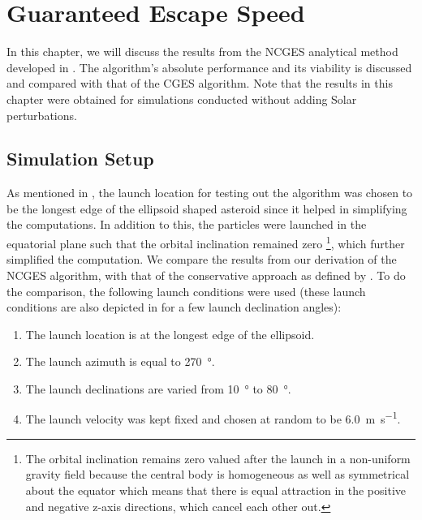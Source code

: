 \chapter{Guaranteed Escape Speed}
\label{chap:nonconservative}
\graphicspath{{Results/Images/}}

In this chapter, we will discuss the results from the \gls{NCGES} analytical method developed in . The algorithm's absolute performance and its viability is discussed and compared with that of the \gls{CGES} algorithm. Note that the results in this chapter were obtained for simulations conducted without adding Solar perturbations.

\section{Simulation Setup}
\label{sec:nonconservative_simulation_setup}
As mentioned in , the launch location for testing out the algorithm was chosen to be the longest edge of the ellipsoid shaped asteroid since it helped in simplifying the computations. In addition to this, the particles were launched in the equatorial plane such that the orbital inclination remained zero \footnote{The orbital inclination remains zero valued after the launch in a non-uniform gravity field because the central body is homogeneous as well as symmetrical about the equator which means that there is equal attraction in the positive and negative z-axis directions, which cancel each other out.}, which further simplified the computation.
%
\newline\newline
%
We compare the results from our derivation of the \gls{NCGES} algorithm, with that of the conservative approach as defined by \cite{scheeresBook}. To do the comparison, the following launch conditions were used (these launch conditions are also depicted in  for a few launch declination angles):
\begin{enumerate}
    \item The launch location is at the longest edge of the ellipsoid.
    \item The launch azimuth is equal to \SI{270}{\degree}.
    \item The launch declinations are varied from \SI{10}{\degree} to \SI{80}{\degree}.
    \item The launch velocity was kept fixed and chosen at random to be \SI{6.0}{\metre \per \second}.
\end{enumerate}
